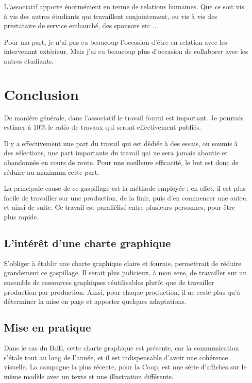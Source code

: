    L'associatif apporte énormément en terme de relations humaines. Que ce soit vis à vis des autres étudiants qui travaillent conjointement, ou vis à vis des prestataire de service embauché, des sponsors etc ...
    
    Pour ma part, je n'ai pas eu beaucoup l'occasion d'être en relation avec les intervenant extérieur.
    Mais j'ai eu beaucoup plus d'occasion de collaborer avec les autres étudiants.
    
    
    
    
        
        
\section{Conclusion}

    De manière générale, dans l'associatif le travail fourni est important. Je pourrais estimer à 10\% le ratio de travaux qui seront effectivement publiés.

    Il y a effectivement une part du travail qui est dédiée à des essais, ou soumis à des sélections, une part importante du travail qui ne sera jamais aboutie et abandonnée en cours de route. Pour une meilleure efficacité, le but est donc de réduire au maximum cette part.

    La principale cause de ce gaspillage est la méthode employée : en effet, il est plus facile de travailler sur une production, de la finir, puis d'en commencer une autre, et ainsi de suite. Ce travail est parallélisé entre plusieurs personnes, pour être plus rapide.

    \subsection{L'intérêt d'une charte graphique}
    
        S'obliger à établir une charte graphique claire et fournie, permettrait de réduire grandement ce gaspillage.
        Il serait plus judicieux, à mon sens, de travailler sur un ensemble de ressources graphiques réutilisables plutôt que de travailler production par production.
        Ainsi, pour chaque production, il ne reste plus qu'à déterminer la mise en page et  apporter quelques adaptations.

    \subsection{Mise en pratique}

        Dans le cas du BdE, cette charte graphique est présente, car la communication s'étale tout au long de l'année, et il est indispensable d'avoir une cohérence visuelle.
        La campagne la plus récente, pour la Coop, est une série d'affiches sur le même modèle avec un texte et une illustration différente.
        
